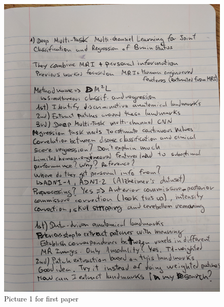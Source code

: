 \documentclass{article}
\begin{document}
\begin{figure}[h!]
\centering
\includegraphics[width=12cm]{paper1_1.jpg}
\caption{Picture 1 for first paper}
\label{fig:paper1_1}
\end{figure}
\end{document}
